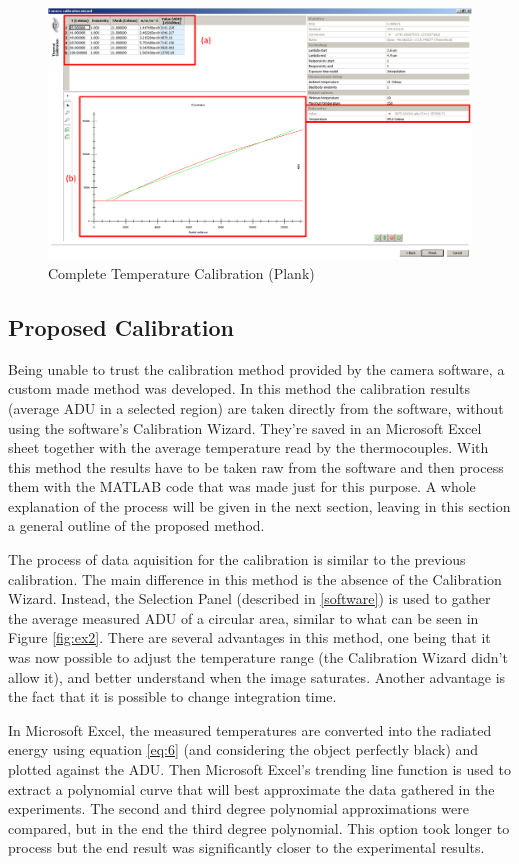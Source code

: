\begin{figure}[h]
\centering
\includegraphics[width=0.7\linewidth]{Figures/4.Chapter/calibracao.png}
\caption{Complete Temperature Calibration (Plank)}
\label{fig:calib}
\end{figure}

\subsection{Proposed Calibration}
\par Being unable to trust the calibration method provided by the camera software, a custom made method was developed. In this method the calibration results (average ADU in a selected region) are taken directly from the software, without using the software's Calibration Wizard. They're saved in an Microsoft Excel sheet together with the average temperature read by the thermocouples. With this method the results have to be taken raw from the software and then process them with the MATLAB code that was made just for this purpose. A whole explanation of the process will be given in the next section, leaving in this section a general outline of the proposed method.\\

\par The process of data aquisition for the calibration is similar to the previous calibration. The main difference in this method is the absence of the Calibration Wizard. Instead, the Selection Panel (described in \ref{software}) is used to gather the average measured ADU of a circular area, similar to what can be seen in Figure \ref{fig:ex2}. There are several advantages in this method, one being that it was now possible to adjust the temperature range (the Calibration Wizard didn't allow it), and better understand when the image saturates. Another advantage is the fact that it is possible to change integration time. \\

\par In Microsoft Excel, the measured temperatures are converted into the radiated energy using equation \ref{eq:6} (and considering the object perfectly black) and plotted against the ADU. Then Microsoft Excel's trending line function is used to extract a polynomial curve that will best approximate the data gathered in the experiments. The second and third degree polynomial approximations were compared, but in the end the third degree polynomial. This option took longer to process but the end result was significantly closer to the experimental results. \\

